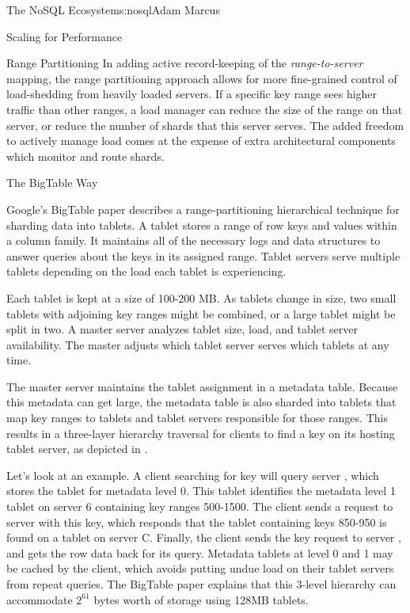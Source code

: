 \begin{aosachapter}{The NoSQL Ecosystem}{s:nosql}{Adam Marcus}
\begin{aosasect1}{Scaling for Performance}
\begin{aosasect2}{Range Partitioning}
In adding active record-keeping of the \emph{range-to-server} mapping,
the range partitioning approach allows for more fine-grained control
of load-shedding from heavily loaded servers.  If a specific key range
sees higher traffic than other ranges, a load manager can reduce the
size of the range on that server, or reduce the number of shards that
this server serves.  The added freedom to actively manage load comes
at the expense of extra architectural components which monitor and
route shards.

\vspace{-0.1cm} %
\begin{aosasect3}{The BigTable Way}

Google's BigTable paper describes a range-partitioning hierarchical
technique for sharding data into tablets.  A tablet stores a range of
row keys and values within a column family.  It maintains all
of the necessary logs and data structures to answer queries about the
keys in its assigned range.  Tablet servers serve multiple tablets
depending on the load each tablet is experiencing.

Each tablet is kept at a size of 100-200 MB\@.  As tablets change in size, two 
small tablets with adjoining key ranges might be combined, or a large tablet might be
split in two.  A master server analyzes tablet size,
load, and tablet server availability.  The master adjusts which tablet
server serves which tablets at any time.


The master server maintains the tablet assignment in a metadata table.
Because this metadata can get large, the metadata table is also
sharded into tablets that map key ranges to tablets and tablet servers
responsible for those ranges.  This results in a three-layer hierarchy
traversal for clients to find a key on its hosting tablet server,
as depicted in .

Let's look at an example.  A client searching for key
 will query server , which stores the tablet for
metadata level 0.  This tablet identifies the metadata level 1 tablet
on server 6 containing key ranges 500-1500.  The client sends a
request to server  with this key, which responds that the
tablet containing keys 850-950 is found on a tablet on server
C\@.  Finally, the client sends the key request to server , and
gets the row data back for its query.  Metadata tablets at level 0 and
1 may be cached by the client, which avoids putting undue load on
their tablet servers from repeat queries.  The BigTable paper explains
that this 3-level hierarchy can accommodate $2^{61}$ bytes worth of storage
using 128MB tablets.


\end{aosasect3}
\end{aosasect2}
\end{aosasect1}
\end{aosachapter}
